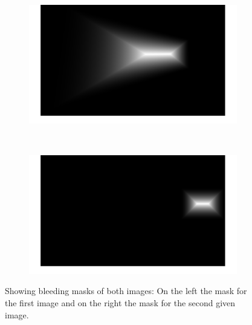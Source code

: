 \documentclass{paper}
\begin{document}
\begin{figure}[H]
    \centering
    \begin{subfigure}{0.45\textwidth}
        \includegraphics[width=\textwidth]{stitching/padded_mask_left_1}
    \end{subfigure}
    ~
        \begin{subfigure}{0.45\textwidth}
        \includegraphics[width=\textwidth]{stitching/padded_mask_right_1}
    \end{subfigure}
    
    \caption{Showing bleeding masks of both images: On the left the mask for the first image and on the right the mask for the second given image.}
    \label{fig:stitching_masks}       
\end{figure}
\end{document}
